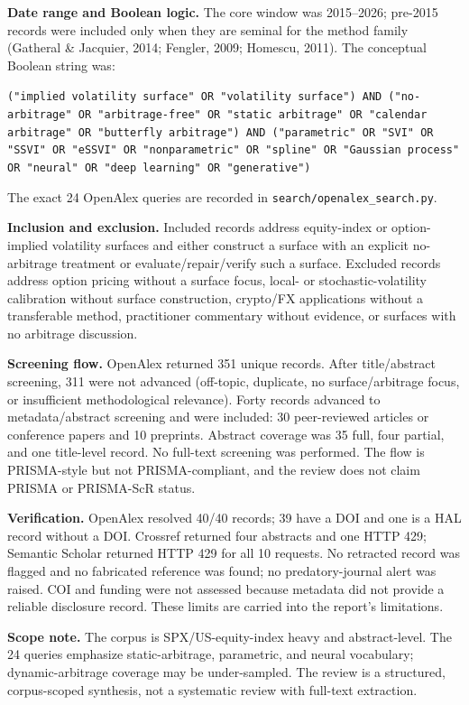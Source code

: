 \documentclass[11pt]{article}
\begin{document}
\textbf{Date range and Boolean logic.} The core window was 2015–2026; pre-2015 records were included only when they are seminal for the method family (Gatheral \& Jacquier, 2014; Fengler, 2009; Homescu, 2011). The conceptual Boolean string was:

\texttt{("implied volatility surface" OR "volatility surface") AND ("no-arbitrage" OR "arbitrage-free" OR "static arbitrage" OR "calendar arbitrage" OR "butterfly arbitrage") AND ("parametric" OR "SVI" OR "SSVI" OR "eSSVI" OR "nonparametric" OR "spline" OR "Gaussian process" OR "neural" OR "deep learning" OR "generative")}

The exact 24 OpenAlex queries are recorded in \texttt{search/openalex\_search.py}.

\textbf{Inclusion and exclusion.} Included records address equity-index or option-implied volatility surfaces and either construct a surface with an explicit no-arbitrage treatment or evaluate/repair/verify such a surface. Excluded records address option pricing without a surface focus, local- or stochastic-volatility calibration without surface construction, crypto/FX applications without a transferable method, practitioner commentary without evidence, or surfaces with no arbitrage discussion.

\textbf{Screening flow.} OpenAlex returned 351 unique records. After title/abstract screening, 311 were not advanced (off-topic, duplicate, no surface/arbitrage focus, or insufficient methodological relevance). Forty records advanced to metadata/abstract screening and were included: 30 peer-reviewed articles or conference papers and 10 preprints. Abstract coverage was 35 full, four partial, and one title-level record. No full-text screening was performed. The flow is PRISMA-style but not PRISMA-compliant, and the review does not claim PRISMA or PRISMA-ScR status.

\textbf{Verification.} OpenAlex resolved 40/40 records; 39 have a DOI and one is a HAL record without a DOI. Crossref returned four abstracts and one HTTP 429; Semantic Scholar returned HTTP 429 for all 10 requests. No retracted record was flagged and no fabricated reference was found; no predatory-journal alert was raised. COI and funding were not assessed because metadata did not provide a reliable disclosure record. These limits are carried into the report’s limitations.

\textbf{Scope note.} The corpus is SPX/US-equity-index heavy and abstract-level. The 24 queries emphasize static-arbitrage, parametric, and neural vocabulary; dynamic-arbitrage coverage may be under-sampled. The review is a structured, corpus-scoped synthesis, not a systematic review with full-text extraction.
\end{document}
